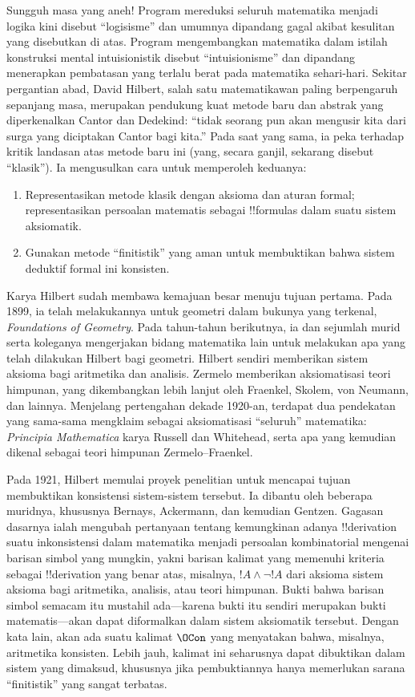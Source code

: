 \documentclass[../../../include/open-logic-section]{subfiles}
\begin{document}
Sungguh masa yang aneh!{} Program mereduksi seluruh matematika menjadi logika
kini disebut ``logisisme'' dan umumnya dipandang gagal akibat kesulitan yang
disebutkan di atas. Program mengembangkan matematika dalam istilah konstruksi
mental intuisionistik disebut ``intuisionisme'' dan dipandang menerapkan
pembatasan yang terlalu berat pada matematika sehari-hari. Sekitar pergantian
abad, David Hilbert, salah satu matematikawan paling berpengaruh sepanjang
masa, merupakan pendukung kuat metode baru dan abstrak yang diperkenalkan
Cantor dan Dedekind: ``tidak seorang pun akan mengusir kita dari surga yang
diciptakan Cantor bagi kita.'' Pada saat yang sama, ia peka terhadap kritik
landasan atas metode baru ini (yang, secara ganjil, sekarang disebut
``klasik''). Ia mengusulkan cara untuk memperoleh keduanya:
\begin{enumerate}
\item Representasikan metode klasik dengan aksioma dan aturan formal;
  representasikan persoalan matematis sebagai !!{formula}s dalam suatu sistem
  aksiomatik.
\item Gunakan metode ``finitistik'' yang aman untuk membuktikan bahwa sistem
  deduktif formal ini konsisten.
\end{enumerate}

Karya Hilbert sudah membawa kemajuan besar menuju tujuan pertama. Pada 1899,
ia telah melakukannya untuk geometri dalam bukunya yang terkenal,
\emph{Foundations of Geometry}. Pada tahun-tahun berikutnya, ia dan sejumlah
murid serta koleganya mengerjakan bidang matematika lain untuk melakukan apa
yang telah dilakukan Hilbert bagi geometri. Hilbert sendiri memberikan
sistem aksioma bagi aritmetika dan analisis. Zermelo memberikan aksiomatisasi
teori himpunan, yang dikembangkan lebih lanjut oleh Fraenkel, Skolem, von
Neumann, dan lainnya. Menjelang pertengahan dekade 1920-an, terdapat dua
pendekatan yang sama-sama mengklaim sebagai aksiomatisasi ``seluruh''
matematika: \emph{Principia Mathematica} karya Russell dan Whitehead, serta
apa yang kemudian dikenal sebagai teori himpunan Zermelo--Fraenkel.

Pada 1921, Hilbert memulai proyek penelitian untuk mencapai tujuan
membuktikan konsistensi sistem-sistem tersebut. Ia dibantu oleh beberapa
muridnya, khususnya Bernays, Ackermann, dan kemudian Gentzen. Gagasan dasarnya
ialah mengubah pertanyaan tentang kemungkinan adanya !!{derivation} suatu
inkonsistensi dalam matematika menjadi persoalan kombinatorial mengenai
barisan simbol yang mungkin, yakni barisan kalimat yang memenuhi kriteria
sebagai !!{derivation} yang benar atas, misalnya, $!A \land \lnot !A$ dari
aksioma sistem aksioma bagi aritmetika, analisis, atau teori himpunan. Bukti
bahwa barisan simbol semacam itu mustahil ada---karena bukti itu sendiri
merupakan bukti matematis---akan dapat diformalkan dalam sistem aksiomatik
tersebut. Dengan kata lain, akan ada suatu kalimat $\OCon$ yang menyatakan
bahwa, misalnya, aritmetika konsisten. Lebih jauh, kalimat ini seharusnya dapat
dibuktikan dalam sistem yang dimaksud, khususnya jika pembuktiannya hanya
memerlukan sarana ``finitistik'' yang sangat terbatas.
\end{document}

